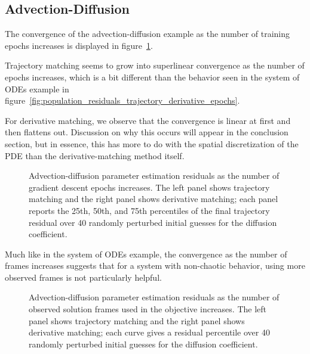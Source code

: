 \documentclass{article}
\begin{document}
\FloatBarrier
\subsection{Advection-Diffusion}

The convergence of the advection-diffusion example as the number of training epochs increases is displayed in figure~\ref{fig:advectiondiffusion_residual_methods_percentiles_by_epochs}.

Trajectory matching seems to grow into superlinear convergence as the number of epochs increases, which is a bit different than the behavior seen in the system of ODEs example in figure~\ref{fig:population_residuals_trajectory_derivative_epochs}.

For derivative matching, we observe that the convergence is linear at first and then flattens out. Discussion on why this occurs will appear in the conclusion section, but in essence, this has more to do with the spatial discretization of the PDE than the derivative-matching method itself.

\begin{figure}[htpb]
    \centering
    
    \caption{Advection-diffusion parameter estimation residuals as the number of gradient descent epochs increases. The left panel shows trajectory matching and the right panel shows derivative matching; each panel reports the 25th, 50th, and 75th percentiles of the final trajectory residual over 40 randomly perturbed initial guesses for the diffusion coefficient.}
    \label{fig:advectiondiffusion_residual_methods_percentiles_by_epochs}
\end{figure}

Much like in the system of ODEs example, the convergence as the number of frames increases suggests that for a system with non-chaotic behavior, using more observed frames is not particularly helpful.

\begin{figure}[htpb]
    \centering
    
    \caption{Advection-diffusion parameter estimation residuals as the number of observed solution frames used in the objective increases. The left panel shows trajectory matching and the right panel shows derivative matching; each curve gives a residual percentile over 40 randomly perturbed initial guesses for the diffusion coefficient.}
    \label{fig:advectiondiffusion_residual_methods_percentiles_by_frames}
\end{figure}
\end{document}
